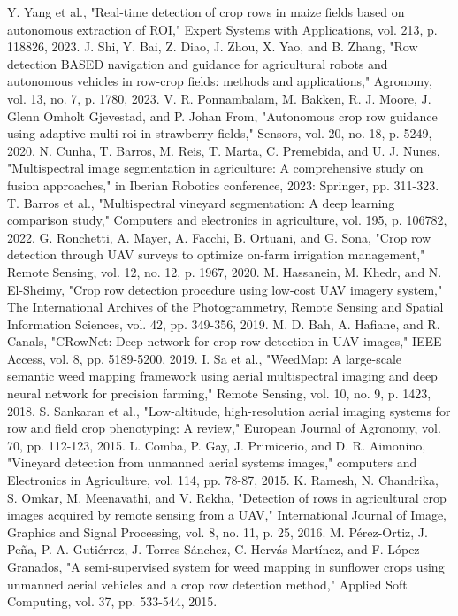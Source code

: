 \documentclass[conference]{IEEEtran}
\begin{document}
\begin{thebibliography}{00}
 Y. Yang et al., "Real-time detection of crop rows in maize fields based on autonomous extraction of ROI," Expert Systems with Applications, vol. 213, p. 118826, 2023.
 J. Shi, Y. Bai, Z. Diao, J. Zhou, X. Yao, and B. Zhang, "Row detection BASED navigation and guidance for agricultural robots and autonomous vehicles in row-crop fields: methods and applications," Agronomy, vol. 13, no. 7, p. 1780, 2023.
 V. R. Ponnambalam, M. Bakken, R. J. Moore, J. Glenn Omholt Gjevestad, and P. Johan From, "Autonomous crop row guidance using adaptive multi-roi in strawberry fields," Sensors, vol. 20, no. 18, p. 5249, 2020.
 N. Cunha, T. Barros, M. Reis, T. Marta, C. Premebida, and U. J. Nunes, "Multispectral image segmentation in agriculture: A comprehensive study on fusion approaches," in Iberian Robotics conference, 2023: Springer, pp. 311-323. 
 T. Barros et al., "Multispectral vineyard segmentation: A deep learning comparison study," Computers and electronics in agriculture, vol. 195, p. 106782, 2022.
 G. Ronchetti, A. Mayer, A. Facchi, B. Ortuani, and G. Sona, "Crop row detection through UAV surveys to optimize on-farm irrigation management," Remote Sensing, vol. 12, no. 12, p. 1967, 2020.
 M. Hassanein, M. Khedr, and N. El-Sheimy, "Crop row detection procedure using low-cost UAV imagery system," The International Archives of the Photogrammetry, Remote Sensing and Spatial Information Sciences, vol. 42, pp. 349-356, 2019.
 M. D. Bah, A. Hafiane, and R. Canals, "CRowNet: Deep network for crop row detection in UAV images," IEEE Access, vol. 8, pp. 5189-5200, 2019.
 I. Sa et al., "WeedMap: A large-scale semantic weed mapping framework using aerial multispectral imaging and deep neural network for precision farming," Remote Sensing, vol. 10, no. 9, p. 1423, 2018.
 S. Sankaran et al., "Low-altitude, high-resolution aerial imaging systems for row and field crop phenotyping: A review," European Journal of Agronomy, vol. 70, pp. 112-123, 2015.
 L. Comba, P. Gay, J. Primicerio, and D. R. Aimonino, "Vineyard detection from unmanned aerial systems images," computers and Electronics in Agriculture, vol. 114, pp. 78-87, 2015.
 K. Ramesh, N. Chandrika, S. Omkar, M. Meenavathi, and V. Rekha, "Detection of rows in agricultural crop images acquired by remote sensing from a UAV," International Journal of Image, Graphics and Signal Processing, vol. 8, no. 11, p. 25, 2016.
 M. Pérez-Ortiz, J. Peña, P. A. Gutiérrez, J. Torres-Sánchez, C. Hervás-Martínez, and F. López-Granados, "A semi-supervised system for weed mapping in sunflower crops using unmanned aerial vehicles and a crop row detection method," Applied Soft Computing, vol. 37, pp. 533-544, 2015.

\end{thebibliography}
\end{document}
